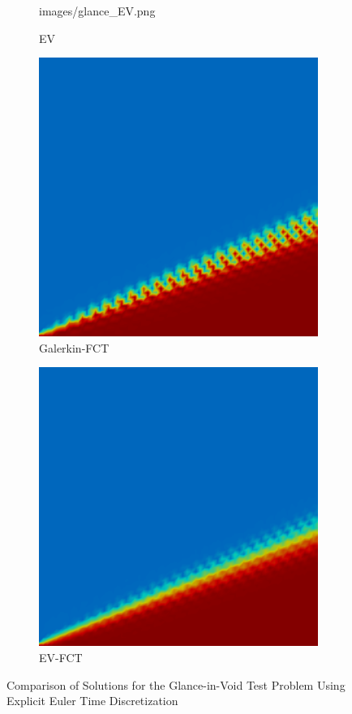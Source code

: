 \begin{figure}[ht]
\begin{subfigure}{0.45\textwidth}
        {images/glance_EV.png}
      \caption{EV}
   \end{subfigure}
   \begin{subfigure}{0.45\textwidth}
      \includegraphics[width=\textwidth]
        {images/glance_GalFCT.png}
      \caption{Galerkin-FCT}
   \end{subfigure}
   \begin{subfigure}{0.45\textwidth}
      \includegraphics[width=\textwidth]
        {images/glance_EVFCT.png}
      \caption{EV-FCT}
   \end{subfigure}
   \caption{Comparison of Solutions for the Glance-in-Void Test
     Problem Using Explicit Euler Time Discretization}
   \label{fig:glance_in_void_fe}
\end{figure}
\clearpage
